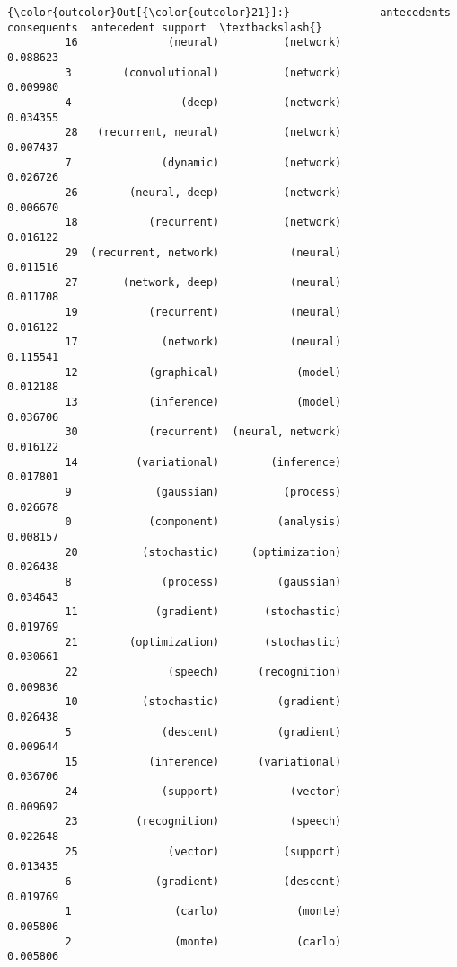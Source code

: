 \documentclass[11pt]{article}
\begin{document}
\begin{Verbatim}[commandchars=\\\{\}]
{\color{outcolor}Out[{\color{outcolor}21}]:}              antecedents        consequents  antecedent support  \textbackslash{}
         16              (neural)          (network)            0.088623   
         3        (convolutional)          (network)            0.009980   
         4                 (deep)          (network)            0.034355   
         28   (recurrent, neural)          (network)            0.007437   
         7              (dynamic)          (network)            0.026726   
         26        (neural, deep)          (network)            0.006670   
         18           (recurrent)          (network)            0.016122   
         29  (recurrent, network)           (neural)            0.011516   
         27       (network, deep)           (neural)            0.011708   
         19           (recurrent)           (neural)            0.016122   
         17             (network)           (neural)            0.115541   
         12           (graphical)            (model)            0.012188   
         13           (inference)            (model)            0.036706   
         30           (recurrent)  (neural, network)            0.016122   
         14         (variational)        (inference)            0.017801   
         9             (gaussian)          (process)            0.026678   
         0            (component)         (analysis)            0.008157   
         20          (stochastic)     (optimization)            0.026438   
         8              (process)         (gaussian)            0.034643   
         11            (gradient)       (stochastic)            0.019769   
         21        (optimization)       (stochastic)            0.030661   
         22              (speech)      (recognition)            0.009836   
         10          (stochastic)         (gradient)            0.026438   
         5              (descent)         (gradient)            0.009644   
         15           (inference)      (variational)            0.036706   
         24             (support)           (vector)            0.009692   
         23         (recognition)           (speech)            0.022648   
         25              (vector)          (support)            0.013435   
         6             (gradient)          (descent)            0.019769   
         1                (carlo)            (monte)            0.005806   
         2                (monte)            (carlo)            0.005806   
         

\end{Verbatim}
\end{document}
